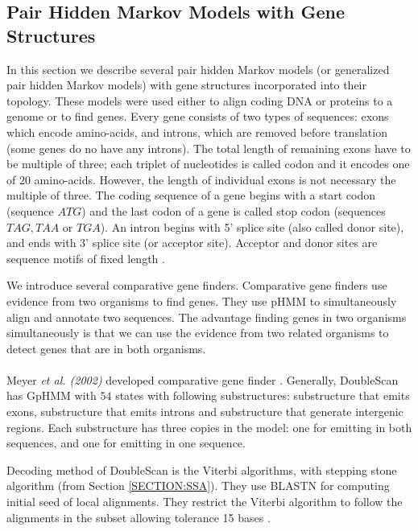 \subsection{Pair Hidden Markov Models with Gene Structures}

In this section we describe several pair hidden Markov models (or generalized
pair hidden Markov models) with gene structures incorporated into their
topology. These models were used either to align coding DNA or proteins to a
genome or to find genes. Every gene consists of two types of sequences: exons
which encode amino-acids, and introns, which are removed before translation
(some genes do no have any introns). The total length of remaining exons have
to be multiple of three; each triplet of nucleotides is called codon and it
encodes one of $20$ amino-acids. However, the length of individual exons is not
necessary the multiple of three. The coding sequence of a gene begins with a
start codon (sequence $ATG$) and the last codon of a gene is called stop codon
(sequences $TAG,TAA$ or $TGA$).  An intron begins with 5' splice site (also
called donor site),  and ends with 3' splice site (or acceptor site).  Acceptor
and donor sites are sequence motifs of fixed length
\cite{Pairagon2009,UnderstandingBioinformatics}.

We introduce several comparative gene finders. Comparative gene finders
use evidence from two organisms to find genes. They use pHMM to simultaneously
align and annotate  two sequences. The advantage finding genes in two organisms
simultaneously is that we can use the evidence from two related organisms to
detect genes that are in both organisms.

\paragraph{}
Meyer {\it et al. (2002)} developed comparative gene finder .
Generally, DoubleScan has GpHMM with $54$ states with following substructures: 
substructure that emits exons, substructure that emits introns
and substructure that generate intergenic regions. Each substructure has three
copies in the model: one for emitting in both sequences, and one for emitting in one sequence.
\nocite{Meyer2002}

Decoding method of DoubleScan is the Viterbi algorithms, with stepping stone
algorithm (from Section \ref{SECTION:SSA}). They use BLASTN \cite{Altschul1990}
for computing initial seed of local alignments. They restrict the Viterbi
algorithm to follow the alignments in the subset allowing tolerance 15 bases
\cite{Meyer2002}.

